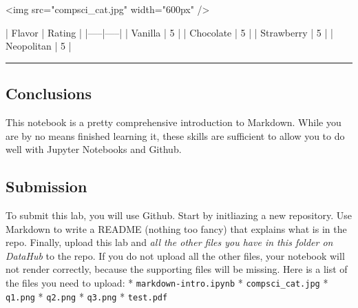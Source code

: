 \documentclass[11pt]{article}
\newenvironment{Shaded}{}{}
\newcommand{\NormalTok}[1]{{#1}}
\begin{document}
    \begin{Shaded}
\begin{Highlighting}[]
\NormalTok{<img src="compsci_cat.jpg" width="600px" />}

\NormalTok{| Flavor | Rating |}
\NormalTok{|-----|-----|}
\NormalTok{| Vanilla | 5 |}
\NormalTok{| Chocolate | 5 |}
\NormalTok{| Strawberry | 5 |}
\NormalTok{| Neopolitan | 5 |}
\end{Highlighting}
\end{Shaded}

\begin{center}\rule{0.5\linewidth}{\linethickness}\end{center}

    \hypertarget{conclusion}{}

\hypertarget{conclusions}{%
\subsection{Conclusions}\label{conclusions}}

This notebook is a pretty comprehensive introduction to Markdown. While
you are by no means finished learning it, these skills are sufficient to
allow you to do well with Jupyter Notebooks and Github. 

    \hypertarget{submission}{}

\hypertarget{submission}{%
\subsection{Submission}\label{submission}}

To submit this lab, you will use Github. Start by initliazing a new
repository. Use Markdown to write a README (nothing too fancy) that
explains what is in the repo. Finally, upload this lab and \emph{all the
other files you have in this folder on DataHub} to the repo. If you do
not upload all the other files, your notebook will not render correctly,
because the supporting files will be missing. Here is a list of the
files you need to upload: * \texttt{markdown-intro.ipynb} *
\texttt{compsci\_cat.jpg} * \texttt{q1.png} * \texttt{q2.png} *
\texttt{q3.png} * \texttt{test.pdf}


    
    
    
    
\end{document}

